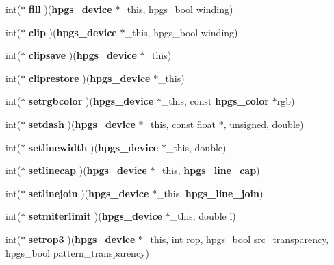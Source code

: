 \begin{DoxyCompactItemize}
\item 
int($\ast$ {\bfseries fill} )({\bf hpgs\_\-device} $\ast$\_\-this, hpgs\_\-bool winding)\label{structhpgs__device__vtable__st_a4af148c1a1b85a60c548044b900e4122}

\item 
int($\ast$ {\bfseries clip} )({\bf hpgs\_\-device} $\ast$\_\-this, hpgs\_\-bool winding)\label{structhpgs__device__vtable__st_aebf6c867c63f6073f6331b5437c110f2}

\item 
int($\ast$ {\bfseries clipsave} )({\bf hpgs\_\-device} $\ast$\_\-this)\label{structhpgs__device__vtable__st_a57bb09f77e43229624be5b3de22b9008}

\item 
int($\ast$ {\bfseries cliprestore} )({\bf hpgs\_\-device} $\ast$\_\-this)\label{structhpgs__device__vtable__st_aca68f41a1cce4a6e60cae48418dd6665}

\item 
int($\ast$ {\bfseries setrgbcolor} )({\bf hpgs\_\-device} $\ast$\_\-this, const {\bf hpgs\_\-color} $\ast$rgb)\label{structhpgs__device__vtable__st_aca3c049976707c1a86bdfcfaf195d105}

\item 
int($\ast$ {\bfseries setdash} )({\bf hpgs\_\-device} $\ast$\_\-this, const float $\ast$, unsigned, double)\label{structhpgs__device__vtable__st_ae2111971e1822582a9d7ade1f16e1bab}

\item 
int($\ast$ {\bfseries setlinewidth} )({\bf hpgs\_\-device} $\ast$\_\-this, double)\label{structhpgs__device__vtable__st_acbf75582e190064c7a024cba5587c4f8}

\item 
int($\ast$ {\bfseries setlinecap} )({\bf hpgs\_\-device} $\ast$\_\-this, {\bf hpgs\_\-line\_\-cap})\label{structhpgs__device__vtable__st_a57e5a4206e37340fbdadd216a7b10bae}

\item 
int($\ast$ {\bfseries setlinejoin} )({\bf hpgs\_\-device} $\ast$\_\-this, {\bf hpgs\_\-line\_\-join})\label{structhpgs__device__vtable__st_a5bbc58c850e20ed95e37d1d6d4503579}

\item 
int($\ast$ {\bfseries setmiterlimit} )({\bf hpgs\_\-device} $\ast$\_\-this, double l)\label{structhpgs__device__vtable__st_a6b98bf0b2df5fa5c2b0493b9224e9ac8}

\item 
int($\ast$ {\bfseries setrop3} )({\bf hpgs\_\-device} $\ast$\_\-this, int rop, hpgs\_\-bool src\_\-transparency, hpgs\_\-bool pattern\_\-transparency)\label{structhpgs__device__vtable__st_a244148e4288962733ef93590bc6b0f9b}


\end{DoxyCompactItemize}
